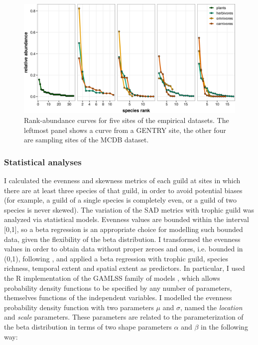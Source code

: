 \begin{figure}[ht!]
\includegraphics[width=\textwidth,height=\textheight,keepaspectratio]{./Figures/chapter04/Fig_2.png}
\caption[Five empirical rank-abundance curves]{\color{Gray}Rank-abundance curves for five sites of the empirical datasets. The leftmost panel shows a curve from a GENTRY site, the other four are sampling sites of the MCDB dataset. }\label{fig:fig4.2}
\end{figure}

\subsubsection*{Statistical analyses}

I calculated the evenness and skewness metrics of each guild at sites in which there are at least three species of that guild, in order to avoid potential biases (for example, a guild of a single species is completely even, or a guild of two species is never skewed). The variation of the SAD metrics with trophic guild was analyzed via statistical models. Evenness values are bounded within the interval [0,1], so a beta regression is an appropriate choice for modelling such bounded data, given the flexibility of the beta distribution. I transformed the evenness values in order to obtain data without proper zeroes and ones, i.e. bounded in (0,1), following \cite{Smithson2006}, and applied a beta regression with trophic guild, species richness, temporal extent and spatial extent as predictors. In particular, I used the R implementation of the GAMLSS family of models \citep{Rigby2005}, which allows probability density functions to be specified by any number of parameters, themselves functions of the independent variables. I modelled the evenness probability density function with two parameters $\mu$ and $\sigma$, named the \textit{location} and \textit{scale} parameters. These parameters are related to the parameterization of the beta distribution in terms of two shape parameters $\alpha$ and $\beta$ in the following way:

